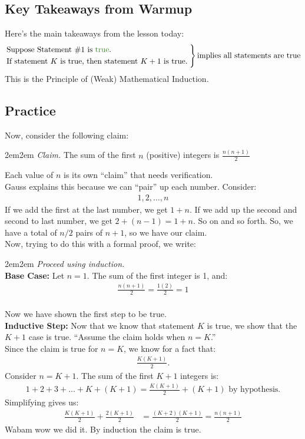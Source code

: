 \documentclass[10pt,oneside]{book}
\newcommand{\gspc}{\vspace{0.13cm}} %
\newcommand{\gline}{\gspc\\} %
\let\endoldproof\endproof
\renewenvironment{proof}[1][\proofname]
  {\vspace{0.2cm}\begin{adjustwidth}{2em}{2em}
   \oldproof[#1]}
  {\endoldproof
   \end{adjustwidth}}
\begin{document}
\subsection*{Key Takeaways from Warmup}
Here's the main takeaways from the lesson today:
\[
\begin{rcases}
  \text{Suppose Statement \#1 is \cg{true}.}\\
  \text{If statement $K$ is true, then statement $K+1$ is true.\;}
\end{rcases} \text{implies all statements are true}
\]
This is the Principle of (Weak) Mathematical Induction. 
\pagebreak
\subsection*{Practice}
Now, consider the following claim:\gspc
\begin{adjustwidth}{2em}{2em}
  \textit{Claim.} The sum of the first $n$ (positive) integers is $\frac{n(n+1)}2$
\end{adjustwidth}\gspc
Each value of $n$ is its own ``claim'' that needs verification. \gline
Gauss explains this because we can ``pair'' up each number. Consider:
\begin{align*}
  1, 2, \ldots,n
\end{align*}
If we add the first at the last number, we get $1 + n$. If we add up the second and second to last number, we get $2 + (n-1) = 1+n$. So on and so forth. So, we have a total of $n/2$ pairs of $n+1$, so we have our claim. \gline
Now, trying to do this with a formal proof, we write:
\begin{proof}
  \textit{Proceed using induction.}\gline
  \textbf{Base Case: } Let $n= 1$. The sum of the first integer is 1, and:
  \begin{align*}
    \frac{n(n+1)}2 = \frac{1(2)}2 = 1
  \end{align*}\gline
  Now we have shown the first step to be true.\gline
  \textbf{Inductive Step: } Now that we know that statement $K$ is true, we show that the $K+1$ case is true. ``Assume the claim holds when $n=K$.''\gline
  Since the claim is true for $n = K$, we know for a fact that:
  \begin{align*}
    \frac{K(K+1)}2.
  \end{align*}
  Consider $n = K +1$. The sum of the first $K+1$ integers is:
  \begin{align*}
    1 + 2+ 3+\ldots + K + (K+1)= \frac{K(K+1)}2 + (K+1) \text{ by hypothesis.}
  \end{align*}
  Simplifying gives us:
  \begin{align*}
    \frac{K(K+1)}2 + \frac{2(K+1)}2 &= \frac{(K+2)(K+1)}2=\frac{n(n+1)}2
  \end{align*}
  Wabam wow we did it. By induction the claim is true. 
\end{proof}
\end{document}
